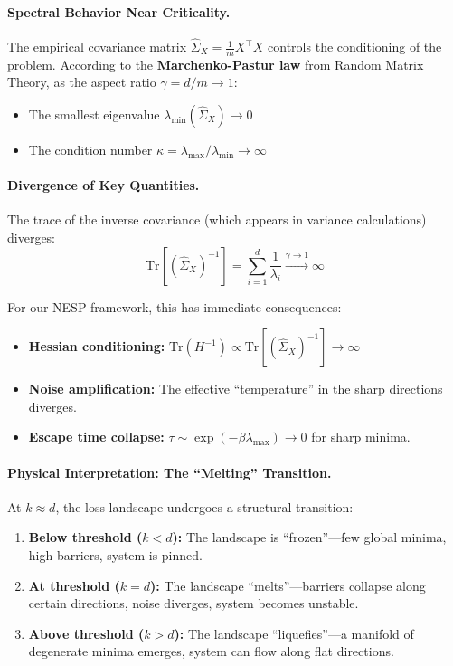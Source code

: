 \documentclass[
  journal=largetwo,
  simfonts=false,
  year=2025,
  volume=37,
]{cup-journal}
\begin{document}
\paragraph{Spectral Behavior Near Criticality.}
The empirical covariance matrix $\hat{\Sigma}_X = \frac{1}{m} X^\top X$ controls the conditioning of the problem. According to the \textbf{Marchenko-Pastur law} from Random Matrix Theory, as the aspect ratio $\gamma = d/m \to 1$:
\begin{itemize}
    \item The smallest eigenvalue $\lambda_{\min}(\hat{\Sigma}_X) \to 0$
    \item The condition number $\kappa = \lambda_{\max}/\lambda_{\min} \to \infty$
\end{itemize}

\paragraph{Divergence of Key Quantities.}
The trace of the inverse covariance (which appears in variance calculations) diverges:
\begin{equation}\label{eq:trace_divergence}
    \text{Tr}\left[ (\hat{\Sigma}_X)^{-1} \right] = \sum_{i=1}^{d} \frac{1}{\lambda_i} \xrightarrow{\gamma \to 1} \infty
\end{equation}

For our NESP framework, this has immediate consequences:
\begin{itemize}
    \item \textbf{Hessian conditioning:} $\text{Tr}(H^{-1}) \propto \text{Tr}[(\hat{\Sigma}_X)^{-1}] \to \infty$
    \item \textbf{Noise amplification:} The effective ``temperature'' in the sharp directions diverges.
    \item \textbf{Escape time collapse:} $\tau \sim \exp(-\beta \lambda_{\max}) \to 0$ for sharp minima.
\end{itemize}



\paragraph{Physical Interpretation: The ``Melting'' Transition.}
At $k \approx d$, the loss landscape undergoes a structural transition:
\begin{enumerate}
    \item \textbf{Below threshold ($k < d$):} The landscape is ``frozen''---few global minima, high barriers, system is pinned.
    \item \textbf{At threshold ($k = d$):} The landscape ``melts''---barriers collapse along certain directions, noise diverges, system becomes unstable.
    \item \textbf{Above threshold ($k > d$):} The landscape ``liquefies''---a manifold of degenerate minima emerges, system can flow along flat directions.
\end{enumerate}
\end{document}
